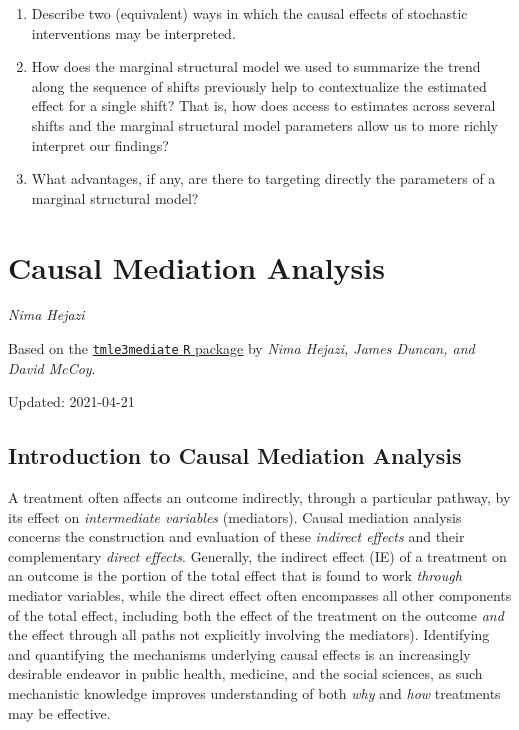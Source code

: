 \documentclass[12pt, krantz2,]{krantz}
\theoremstyle{definition}
\theoremstyle{definition}
\theoremstyle{definition}
\newcommand{\1}{\mathbbm{1}}
\begin{document}
\begin{enumerate}
\def\labelenumi{\arabic{enumi}.}
\item
  Describe two (equivalent) ways in which the causal effects of stochastic
  interventions may be interpreted.
\item
  How does the marginal structural model we used to summarize the trend along
  the sequence of shifts previously help to contextualize the estimated effect
  for a single shift? That is, how does access to estimates across several
  shifts and the marginal structural model parameters allow us to more richly
  interpret our findings?
\item
  What advantages, if any, are there to targeting directly the parameters of a
  marginal structural model?
\end{enumerate}

\hypertarget{causal-mediation-analysis}{%
\section{Causal Mediation Analysis}\label{causal-mediation-analysis}}

\emph{Nima Hejazi}

Based on the \href{https://github.com/tlverse/tmle3mediate}{\texttt{tmle3mediate} \texttt{R}
package} by \emph{Nima Hejazi, James
Duncan, and David McCoy}.

Updated: 2021-04-21

\hypertarget{introduction-to-causal-mediation-analysis}{%
\subsection{Introduction to Causal Mediation Analysis}\label{introduction-to-causal-mediation-analysis}}

A treatment often affects an outcome indirectly, through a particular pathway,
by its effect on \emph{intermediate variables} (mediators). Causal mediation analysis
concerns the construction and evaluation of these \emph{indirect effects} and their
complementary \emph{direct effects}. Generally, the indirect effect (IE) of a
treatment on an outcome is the portion of the total effect that is found to work
\emph{through} mediator variables, while the direct effect often encompasses all
other components of the total effect, including both the effect of the treatment
on the outcome \emph{and} the effect through all paths not explicitly involving the
mediators). Identifying and quantifying the mechanisms underlying causal effects
is an increasingly desirable endeavor in public health, medicine, and the social
sciences, as such mechanistic knowledge improves understanding of both \emph{why} and
\emph{how} treatments may be effective.
\end{document}
